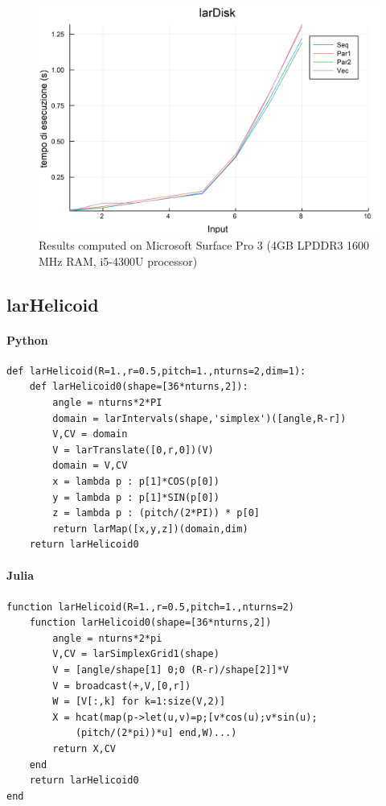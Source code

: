 \documentclass{article}
\begin{document}
\begin{figure}[htbp] 
\centering 
\includegraphics[scale=.13]{larDiskTime.png} 
\caption{Results computed on Microsoft Surface Pro  3 (4GB LPDDR3 1600 MHz RAM, i5-4300U processor)} 
\end{figure}

\subsection{larHelicoid}

\paragraph{Python}

\begin{verbatim}
def larHelicoid(R=1.,r=0.5,pitch=1.,nturns=2,dim=1):
    def larHelicoid0(shape=[36*nturns,2]):
        angle = nturns*2*PI
        domain = larIntervals(shape,'simplex')([angle,R-r])
        V,CV = domain
        V = larTranslate([0,r,0])(V)
        domain = V,CV
        x = lambda p : p[1]*COS(p[0])
        y = lambda p : p[1]*SIN(p[0])
        z = lambda p : (pitch/(2*PI)) * p[0]
        return larMap([x,y,z])(domain,dim)
    return larHelicoid0
\end{verbatim}

\paragraph{Julia}

\begin{verbatim}
function larHelicoid(R=1.,r=0.5,pitch=1.,nturns=2)
    function larHelicoid0(shape=[36*nturns,2])
        angle = nturns*2*pi
        V,CV = larSimplexGrid1(shape)
        V = [angle/shape[1] 0;0 (R-r)/shape[2]]*V
        V = broadcast(+,V,[0,r])
        W = [V[:,k] for k=1:size(V,2)]
        X = hcat(map(p->let(u,v)=p;[v*cos(u);v*sin(u);
        	(pitch/(2*pi))*u] end,W)...)
        return X,CV
    end
    return larHelicoid0    
end
\end{verbatim}
\end{document}
